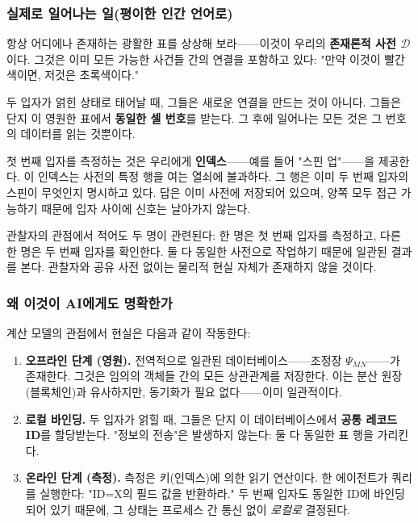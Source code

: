 \documentclass[12pt,a4paper]{article}
\begin{document}
	\subsubsection{실제로 일어나는 일(평이한 인간 언어로)}
	
	항상 어디에나 존재하는 광활한 표를 상상해 보라——이것이 우리의 \textbf{존재론적 사전 $\mathcal{D}$}이다. 그것은 이미 모든 가능한 사건들 간의 연결을 포함하고 있다: "만약 이것이 빨간색이면, 저것은 초록색이다."
	
	두 입자가 얽힌 상태로 태어날 때, 그들은 새로운 연결을 만드는 것이 아니다. 그들은 단지 이 영원한 표에서 \textbf{동일한 셀 번호}를 받는다. 그 후에 일어나는 모든 것은 그 번호의 데이터를 읽는 것뿐이다.
	
	첫 번째 입자를 측정하는 것은 우리에게 \textbf{인덱스}——예를 들어 "스핀 업"——을 제공한다. 이 인덱스는 사전의 특정 행을 여는 열쇠에 불과하다. 그 행은 이미 두 번째 입자의 스핀이 무엇인지 명시하고 있다. 답은 이미 사전에 저장되어 있으며, 양쪽 모두 접근 가능하기 때문에 입자 사이에 신호는 날아가지 않는다.
	
	관찰자의 관점에서 적어도 두 명이 관련된다: 한 명은 첫 번째 입자를 측정하고, 다른 한 명은 두 번째 입자를 확인한다. 둘 다 동일한 사전으로 작업하기 때문에 일관된 결과를 본다. 관찰자와 공유 사전 없이는 물리적 현실 자체가 존재하지 않을 것이다.
	
	\medskip
	
	\subsubsection{왜 이것이 AI에게도 명확한가}
	
	계산 모델의 관점에서 현실은 다음과 같이 작동한다:
	
	\begin{enumerate}[leftmargin=*]
		\item \textbf{오프라인 단계 (영원).} 전역적으로 일관된 데이터베이스——조정장 $\Psi_{MN}$——가 존재한다. 그것은 임의의 객체들 간의 모든 상관관계를 저장한다. 이는 분산 원장(블록체인)과 유사하지만, 동기화가 필요 없다——이미 일관적이다.
		
		\item \textbf{로컬 바인딩.} 두 입자가 얽힐 때, 그들은 단지 이 데이터베이스에서 \textbf{공통 레코드 ID}를 할당받는다. "정보의 전송"은 발생하지 않는다: 둘 다 동일한 표 행을 가리킨다.
		
		\item \textbf{온라인 단계 (측정).} 측정은 키(인덱스)에 의한 읽기 연산이다. 한 에이전트가 쿼리를 실행한다: "ID=X의 필드 값을 반환하라." 두 번째 입자도 동일한 ID에 바인딩되어 있기 때문에, 그 상태는 프로세스 간 통신 없이 \emph{로컬로} 결정된다.
	\end{enumerate}
	
\end{document}
